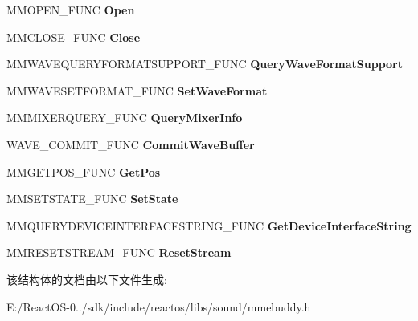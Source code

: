 \begin{DoxyCompactItemize}
\begin{tabbing}
\end{tabbing}\item 
\mbox{\label{struct___m_m_f_u_n_c_t_i_o_n___t_a_b_l_e_a19250d00e5b39d00002f196a05fdbcfa}} 
M\+M\+O\+P\+E\+N\+\_\+\+F\+U\+NC {\bfseries Open}
\item 
\mbox{\label{struct___m_m_f_u_n_c_t_i_o_n___t_a_b_l_e_a4dd3d4e653ef7be5a4964aa81440f610}} 
M\+M\+C\+L\+O\+S\+E\+\_\+\+F\+U\+NC {\bfseries Close}
\item 
\mbox{\label{struct___m_m_f_u_n_c_t_i_o_n___t_a_b_l_e_a6be6c25a92177addc0e7e1749ee5b02d}} 
M\+M\+W\+A\+V\+E\+Q\+U\+E\+R\+Y\+F\+O\+R\+M\+A\+T\+S\+U\+P\+P\+O\+R\+T\+\_\+\+F\+U\+NC {\bfseries Query\+Wave\+Format\+Support}
\item 
\mbox{\label{struct___m_m_f_u_n_c_t_i_o_n___t_a_b_l_e_a822f1d45930f12367118b55f5fe2e8a4}} 
M\+M\+W\+A\+V\+E\+S\+E\+T\+F\+O\+R\+M\+A\+T\+\_\+\+F\+U\+NC {\bfseries Set\+Wave\+Format}
\item 
\mbox{\label{struct___m_m_f_u_n_c_t_i_o_n___t_a_b_l_e_a9e74fe8813de7d2544fedd18cfa4f9c3}} 
M\+M\+M\+I\+X\+E\+R\+Q\+U\+E\+R\+Y\+\_\+\+F\+U\+NC {\bfseries Query\+Mixer\+Info}
\item 
\mbox{\label{struct___m_m_f_u_n_c_t_i_o_n___t_a_b_l_e_a724645ed77e47d279818eae07050d7a7}} 
W\+A\+V\+E\+\_\+\+C\+O\+M\+M\+I\+T\+\_\+\+F\+U\+NC {\bfseries Commit\+Wave\+Buffer}
\item 
\mbox{\label{struct___m_m_f_u_n_c_t_i_o_n___t_a_b_l_e_a52d5a81a2ebea2e4f037672c95d8d8a5}} 
M\+M\+G\+E\+T\+P\+O\+S\+\_\+\+F\+U\+NC {\bfseries Get\+Pos}
\item 
\mbox{\label{struct___m_m_f_u_n_c_t_i_o_n___t_a_b_l_e_a79e2d26c2a52dd27fb3840b41ba59ec9}} 
M\+M\+S\+E\+T\+S\+T\+A\+T\+E\+\_\+\+F\+U\+NC {\bfseries Set\+State}
\item 
\mbox{\label{struct___m_m_f_u_n_c_t_i_o_n___t_a_b_l_e_ae38418141e0b2deef17861357e35cd3b}} 
M\+M\+Q\+U\+E\+R\+Y\+D\+E\+V\+I\+C\+E\+I\+N\+T\+E\+R\+F\+A\+C\+E\+S\+T\+R\+I\+N\+G\+\_\+\+F\+U\+NC {\bfseries Get\+Device\+Interface\+String}
\item 
\mbox{\label{struct___m_m_f_u_n_c_t_i_o_n___t_a_b_l_e_a649f31709d0c2206a0bc0072e6b066f1}} 
M\+M\+R\+E\+S\+E\+T\+S\+T\+R\+E\+A\+M\+\_\+\+F\+U\+NC {\bfseries Reset\+Stream}
\end{DoxyCompactItemize}


该结构体的文档由以下文件生成\+:\begin{DoxyCompactItemize}
\item 
E\+:/\+React\+O\+S-\/0../sdk/include/reactos/libs/sound/mmebuddy.\+h\end{DoxyCompactItemize}
